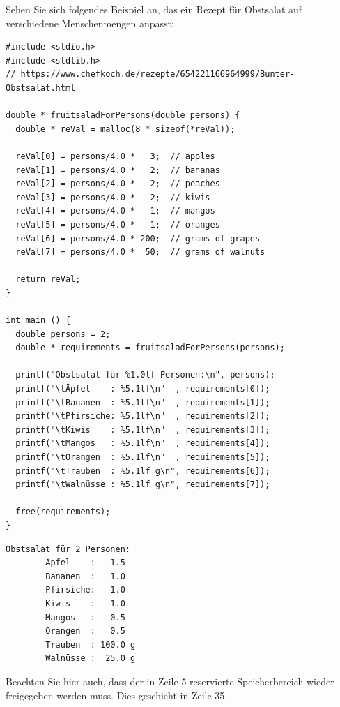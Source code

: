 Sehen Sie sich folgendes Beispiel an, das ein Rezept für Obstsalat auf verschiedene Menschenmengen anpasst:

\begin{codebox}
\begin{verbatim}
#include <stdio.h>
#include <stdlib.h>
// https://www.chefkoch.de/rezepte/654221166964999/Bunter-Obstsalat.html

double * fruitsaladForPersons(double persons) {
  double * reVal = malloc(8 * sizeof(*reVal));

  reVal[0] = persons/4.0 *   3;  // apples
  reVal[1] = persons/4.0 *   2;  // bananas
  reVal[2] = persons/4.0 *   2;  // peaches
  reVal[3] = persons/4.0 *   2;  // kiwis
  reVal[4] = persons/4.0 *   1;  // mangos
  reVal[5] = persons/4.0 *   1;  // oranges
  reVal[6] = persons/4.0 * 200;  // grams of grapes
  reVal[7] = persons/4.0 *  50;  // grams of walnuts

  return reVal;
}

int main () {
  double persons = 2;
  double * requirements = fruitsaladForPersons(persons);

  printf("Obstsalat für %1.0lf Personen:\n", persons);
  printf("\tÄpfel    : %5.1lf\n"  , requirements[0]);
  printf("\tBananen  : %5.1lf\n"  , requirements[1]);
  printf("\tPfirsiche: %5.1lf\n"  , requirements[2]);
  printf("\tKiwis    : %5.1lf\n"  , requirements[3]);
  printf("\tMangos   : %5.1lf\n"  , requirements[4]);
  printf("\tOrangen  : %5.1lf\n"  , requirements[5]);
  printf("\tTrauben  : %5.1lf g\n", requirements[6]);
  printf("\tWalnüsse : %5.1lf g\n", requirements[7]);

  free(requirements);
}
\end{verbatim}
\end{codebox}

\begin{cmdbox}
\begin{verbatim}
Obstsalat für 2 Personen:
        Äpfel    :   1.5
        Bananen  :   1.0
        Pfirsiche:   1.0
        Kiwis    :   1.0
        Mangos   :   0.5
        Orangen  :   0.5
        Trauben  : 100.0 g
        Walnüsse :  25.0 g
\end{verbatim}
\end{cmdbox}

Beachten Sie hier auch, dass der in Zeile 5 reservierte Speicherbereich wieder freigegeben werden muss. Dies geschieht in Zeile 35.

